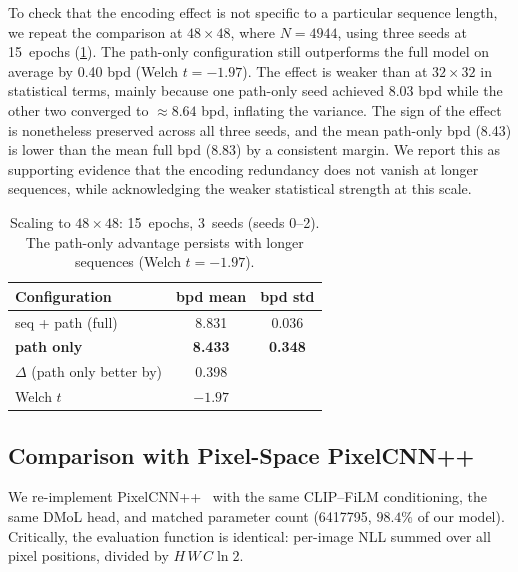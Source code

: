 \documentclass[conference,a4paper]{IEEEtran}
\begin{document}
To check that the encoding effect is not specific to a particular
sequence length, we repeat the comparison at $48\times48$, where
$N=4944$, using three seeds at 15~epochs (\cref{tab:scale}).
The path-only configuration still outperforms the full model on
average by \SI{0.40}{} bpd (Welch $t=-1.97$). The effect is weaker
than at $32\times32$ in statistical terms, mainly because one
path-only seed achieved \SI{8.03}{} bpd while the other two
converged to $\approx 8.64$ bpd, inflating the variance. The sign
of the effect is nonetheless preserved across all three seeds, and
the mean path-only bpd (\num{8.43}) is lower than the mean full bpd
(\num{8.83}) by a consistent margin. We report this as supporting
evidence that the encoding redundancy does not vanish at longer
sequences, while acknowledging the weaker statistical strength at
this scale.

\begin{table}[t]
\centering
\caption{Scaling to $48\times48$: 15~epochs, 3~seeds (seeds 0--2).
The path-only advantage persists with longer sequences
(Welch $t=-1.97$).}
\label{tab:scale}
\begin{tabular}{lcc}
\toprule
Configuration & bpd mean & bpd std \\
\midrule
seq + path (full)        & 8.831 & 0.036 \\
\textbf{path only}       & \bfseries 8.433 & \bfseries 0.348 \\
\midrule
$\Delta$ (path only better by) & 0.398 & \\
Welch $t$                & $-1.97$ & \\
\bottomrule
\end{tabular}
\end{table}

\subsection{Comparison with Pixel-Space PixelCNN++}\label{ssec:pixelcnn}

We re-implement PixelCNN++~\cite{salimans2017pixelcnnpp} with the
same CLIP--FiLM conditioning, the same DMoL head, and matched
parameter count (\num{6417795}, $98.4\%$ of our model). Critically,
the evaluation function is identical: per-image NLL summed over all
pixel positions, divided by $H\,W\,C \ln 2$.
\end{document}
